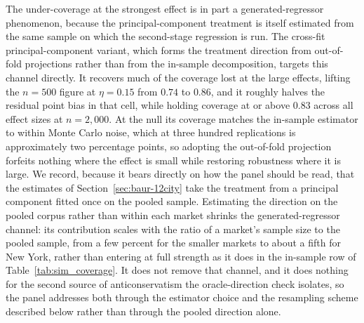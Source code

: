 \documentclass{article}
\begin{document}
The under-coverage at the strongest effect is in part a generated-regressor phenomenon, because the principal-component treatment is itself estimated from the same sample on which the second-stage regression is run. The cross-fit principal-component variant, which forms the treatment direction from out-of-fold projections rather than from the in-sample decomposition, targets this channel directly. It recovers much of the coverage lost at the large effects, lifting the $n = 500$ figure at $\eta = 0.15$ from $0.74$ to $0.86$, and it roughly halves the residual point bias in that cell, while holding coverage at or above $0.83$ across all effect sizes at $n = 2{,}000$. At the null its coverage matches the in-sample estimator to within Monte Carlo noise, which at three hundred replications is approximately two percentage points, so adopting the out-of-fold projection forfeits nothing where the effect is small while restoring robustness where it is large. We record, because it bears directly on how the panel should be read, that the estimates of Section~\ref{sec:baur-12city} take the treatment from a principal component fitted once on the pooled sample. Estimating the direction on the pooled corpus rather than within each market shrinks the generated-regressor channel: its contribution scales with the ratio of a market's sample size to the pooled sample, from a few percent for the smaller markets to about a fifth for New York, rather than entering at full strength as it does in the in-sample row of Table~\ref{tab:sim_coverage}. It does not remove that channel, and it does nothing for the second source of anticonservatism the oracle-direction check isolates, so the panel addresses both through the estimator choice and the resampling scheme described below rather than through the pooled direction alone.
\end{document}
